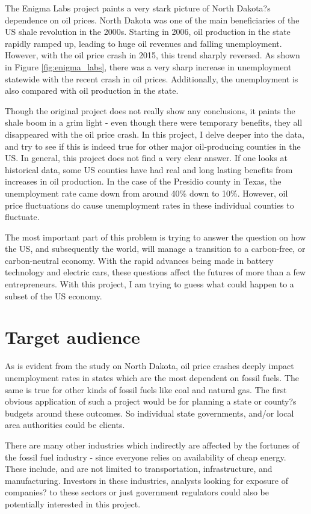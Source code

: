 \documentclass[11pt,letterpaper]{article}
\begin{document}
The Enigma Labs project paints a very stark picture of North Dakota?s dependence on oil prices. North Dakota was one of the main beneficiaries of the US shale revolution in the 2000s. Starting in 2006, oil production in the state rapidly ramped up, leading to huge oil revenues and falling unemployment. However, with the oil price crash in 2015, this trend sharply reversed. As shown in Figure \ref{fig:enigma_labs}, there was a very sharp increase in unemployment statewide with the recent crash in oil prices. Additionally, the unemployment is also compared with oil production in the state. 

Though the original project does not really show any conclusions, it paints the shale boom in a grim light - even though there were temporary benefits, they all disappeared with the oil price crash. In this project, I delve deeper into the data, and try to see if this is indeed true for other major oil-producing counties in the US. In general, this project does not find a very clear answer. If one looks at historical data, some US counties have had real and long lasting benefits from increases in oil production. In the case of the Presidio county in Texas, the unemployment rate came down from around 40\% down to 10\%. However, oil price fluctuations do cause unemployment rates in these individual counties to fluctuate.

The most important part of this problem is trying to answer the question on how the US, and subsequently the world, will manage a transition to a carbon-free, or carbon-neutral economy. With the rapid advances being made in battery technology and electric cars, these questions affect the futures of more than a few entrepreneurs. With this project, I am trying to guess what could happen to a subset of the US economy.

\section{Target audience}

As is evident from the study on North Dakota, oil price crashes deeply impact unemployment rates in states which are the most dependent on fossil fuels. The same is true for other kinds of fossil fuels like coal and natural gas. The first obvious application of such a project would be for planning a state or county?s budgets around these outcomes. So individual state governments, and/or local area authorities could be clients.

There are many other industries which indirectly are affected by the fortunes of the fossil fuel industry - since everyone relies on availability of cheap energy. These include, and are not limited to transportation, infrastructure, and manufacturing. Investors in these industries, analysts looking for exposure of companies? to these sectors or just government regulators could also be potentially interested in this project.
\end{document}
